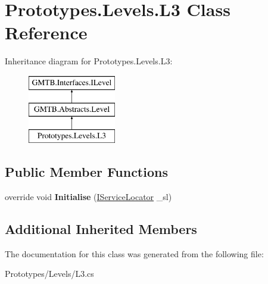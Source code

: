 \hypertarget{class_prototypes_1_1_levels_1_1_l3}{}\section{Prototypes.\+Levels.\+L3 Class Reference}
\label{class_prototypes_1_1_levels_1_1_l3}
Inheritance diagram for Prototypes.\+Levels.\+L3\+:\begin{figure}[H]
\begin{center}
\leavevmode
\includegraphics[height=3.000000cm]{class_prototypes_1_1_levels_1_1_l3}
\end{center}
\end{figure}
\subsection*{Public Member Functions}
\begin{DoxyCompactItemize}
\item 
\mbox{\label{class_prototypes_1_1_levels_1_1_l3_a3bc54461ba03ddd3157220c42bdc6d54}} 
override void {\bfseries Initialise} (\mbox{\hyperlink{interface_g_m_t_b_1_1_interfaces_1_1_i_service_locator}{I\+Service\+Locator}} \+\_\+sl)
\end{DoxyCompactItemize}
\subsection*{Additional Inherited Members}


The documentation for this class was generated from the following file\+:\begin{DoxyCompactItemize}
\item 
Prototypes/\+Levels/L3.\+cs\end{DoxyCompactItemize}
